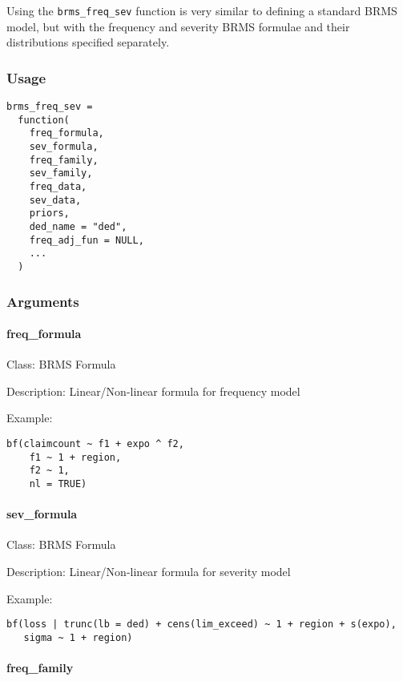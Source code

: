 \documentclass[
]{book}
\begin{document}
Using the \texttt{brms\_freq\_sev} function is very similar to defining a standard BRMS model, but with the frequency and severity BRMS formulae and their distributions specified separately.

\hypertarget{usage}{%
\subsubsection{Usage}\label{usage}}

\begin{verbatim}
brms_freq_sev =
  function(
    freq_formula,
    sev_formula,
    freq_family,
    sev_family,
    freq_data,
    sev_data,
    priors,
    ded_name = "ded",
    freq_adj_fun = NULL,
    ...
  )
\end{verbatim}

\hypertarget{arguments}{%
\subsubsection{Arguments}\label{arguments}}

\hypertarget{freq_formula}{%
\paragraph{freq\_formula}\label{freq_formula}}

Class: BRMS Formula

Description: Linear/Non-linear formula for frequency model

Example:

\begin{verbatim}
bf(claimcount ~ f1 + expo ^ f2,
    f1 ~ 1 + region,
    f2 ~ 1,
    nl = TRUE)
\end{verbatim}

\hypertarget{sev_formula}{%
\paragraph{sev\_formula}\label{sev_formula}}

Class: BRMS Formula

Description: Linear/Non-linear formula for severity model

Example:

\begin{verbatim}
bf(loss | trunc(lb = ded) + cens(lim_exceed) ~ 1 + region + s(expo),
   sigma ~ 1 + region)
\end{verbatim}

\hypertarget{freq_family}{%
\paragraph{freq\_family}\label{freq_family}}
\end{document}
